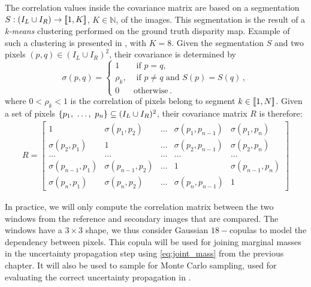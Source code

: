 The correlation values inside the covariance matrix are based on a segmentation $S:(I_L\cup I_R)\rightarrow[\![1,K]\!]$, $K\in\mathbb{N}$, of the images. This segmentation is the result of a \textit{k-means} clustering performed on the ground truth disparity map. Example of such a clustering is presented in , with $K=8$. Given the segmentation $S$ and two pixels $(p, q)\in(I_L\cup I_R)^2$, their covariance is determined by
\begin{equation}\label{eq:correlation}
    \sigma(p, q) =
    \begin{cases}
        1 &\text{ if }p=q,\\
        \rho_k, &\text{ if } p\ne q\text{ and }S(p)=S(q)\,, \\
        0 & \text{otherwise}\,.
    \end{cases}
\end{equation}
where $0<\rho_k<1$ is the correlation of pixels belong to segment $k\in[\![ 1, N]\!]$. Given a set of pixels $\{p_1 , ~\dots, ~ p_n\}\subseteq(I_L\cup I_R)^2$, their covariance matrix $R$ is therefore:
\begin{align}
    R = \begin{bmatrix}
        1 & \sigma(p_{1}, p_{2}) & \dots & \sigma(p_{1}, p_{n-1}) & \sigma(p_{1}, p_{n})\\
        \sigma(p_{2}, p_{1}) & 1 & \dots & \sigma(p_{2}, p_{n-1}) & \sigma(p_{2}, p_{n})\\
        \dots & \dots & \dots & \dots & \dots\\
        \sigma(p_{n-1}, p_{1}) & \sigma(p_{n-1}, p_{2}) & \dots & 1 & \sigma(p_{n-1}, p_{n})\\
        \sigma(p_{n}, p_{1}) & \sigma(p_{n}, p_{2}) & \dots & \sigma(p_{n}, p_{n-1}) & 1
    \end{bmatrix}
\end{align}

In practice, we will only compute the correlation matrix between the two windows from the reference and secondary images that are compared. The windows have a $3\times 3$ shape, we thus consider Gaussian $18-$copulas to model the dependency between pixels. This copula will be used for joining marginal masses in the uncertainty propagation step using \cref{eq:joint_mass} from the previous chapter. It will also be used to sample for Monte Carlo sampling, used for evaluating the correct uncertainty propagation in .

